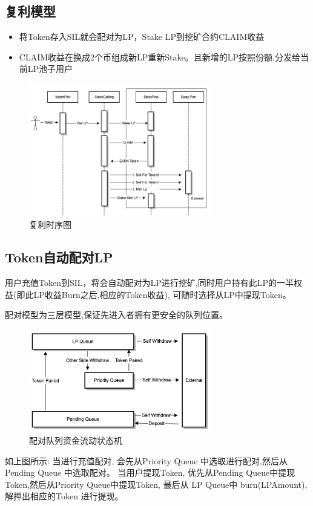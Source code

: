 \documentclass[11pt,letterpaper]{article}
\begin{document}
\begin{multicols}{2}
\subsection{复利模型}
\begin{itemize}
  \item 将Token存入SIL就会配对为LP，Stake LP到挖矿合约CLAIM收益
  \item CLAIM收益在换成2个币组成新LP重新Stake。且新增的LP按照份额,分发给当前LP池子用户
\end{itemize}
\begin{figure}[H]
\centering
\includegraphics[width=8cm]{img/harvest1.png}
\caption{复利时序图}
\label{fig:rc}
\end{figure}

\subsection{Token自动配对LP}
用户充值Token到SIL，将会自动配对为LP进行挖矿,同时用户持有此LP的一半权益(即此LP收益Burn之后,相应的Token收益), 可随时选择从LP中提现Token。

配对模型为三层模型,保证先进入者拥有更安全的队列位置。
\begin{figure}[H]
\centering
\includegraphics[width=8cm]{img/harvest2.png}
\caption{配对队列资金流动状态机}
\label{fig:rc}
\end{figure}
如上图所示:
当进行充值配对, 会先从Priority Queue 中选取进行配对,然后从Pending Queue 中选取配对。
当用户提现Token, 优先从Pending Queue中提现 Token,然后从Priority Queue中提现Token, 最后从 LP Queue中 burn(LPAmount), 解押出相应的Token 进行提现。


\end{multicols}
\end{document}

